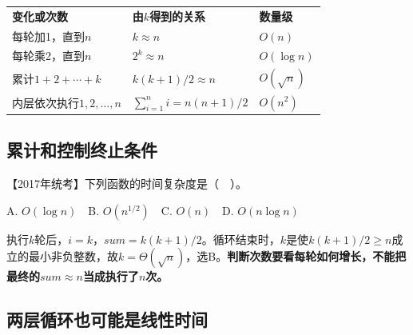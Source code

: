 \hypertarget{ds1-count-method}{}


\hypertarget{ds1-patterns}{}

\par\smallskip\noindent\begin{tabularx}{\linewidth}{@{}YYY@{}}\toprule
{} \textbf{变化或次数} & \textbf{由$k$得到的关系} & \textbf{数量级} \\
每轮加1，直到$n$ & $k\approx n$ & $O(n)$ \\
每轮乘2，直到$n$ & $2^k\approx n$ & $O(\log n)$ \\
累计$1+2+\cdots+k$ & $k(k+1)/2\approx n$ & $O(\sqrt n)$ \\
内层依次执行$1,2,\ldots,n$ & $\sum_{i=1}^n i=n(n+1)/2$ & $O(n^2)$ \\\bottomrule\end{tabularx}\par\smallskip

\hypertarget{ds1-ex2017}{}

\subsection{累计和控制终止条件}\label{ds1-ex2017}

\hypertarget{ds1-ex2017-stem}{}

【2017年统考】下列函数的时间复杂度是（　）。


\hypertarget{ds1-code2017}{}

\Needspace{96.0pt}

\hypertarget{ds1-ex2017-options}{}

A. $O(\log n)$　B. $O(n^{1/2})$　C. $O(n)$　D. $O(n\log n)$


\hypertarget{ds1-ex2017-answer}{}

\begin{solution}
执行$k$轮后，$i=k$，$sum=k(k+1)/2$。循环结束时，$k$是使$k(k+1)/2\ge n$成立的最小非负整数，故$k=\Theta(\sqrt n)$，选B。\textbf{判断次数要看每轮如何增长，不能把最终的$sum\approx n$当成执行了$n$次。}
\end{solution}

\hypertarget{ds1-ex2022}{}

\subsection{两层循环也可能是线性时间}\label{ds1-ex2022}

